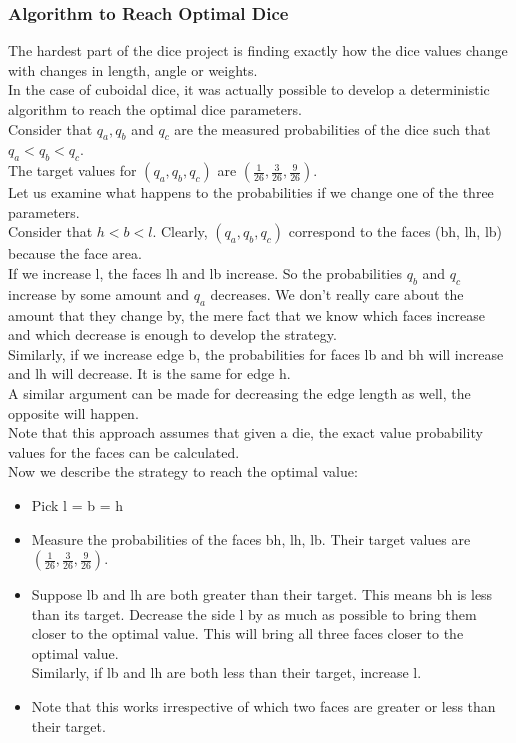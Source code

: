 \subsubsection{Algorithm to Reach Optimal Dice}
The hardest part of the dice project is finding exactly how the dice values change with changes in length, angle or weights.\\
In the case of cuboidal dice, it was actually possible to develop a deterministic algorithm to reach the optimal dice parameters.\\
Consider that $q_a, q_b$ and $q_c$ are the measured probabilities of the dice such that $q_a < q_b < q_c$.\\
The target values for $(q_a, q_b, q_c)$ are $(\frac{1}{26}, \frac{3}{26}, \frac{9}{26})$.\\
Let us examine what happens to the probabilities if we change one of the three parameters.\\
Consider that $h < b < l$. Clearly, $(q_a, q_b, q_c)$ correspond to the faces (bh, lh, lb) because the face area.\\
If we increase l, the faces lh and lb increase. So the probabilities $q_b$ and $q_c$ increase by some amount and $q_a$ decreases. We don't really care about the amount that they change by, the mere fact that we know which faces increase and which decrease is enough to develop the strategy.\\
Similarly, if we increase edge b, the probabilities for faces lb and bh will increase and lh will decrease. It is the same for edge h.\\
A similar argument can be made for decreasing the edge length as well, the opposite will happen.\\
Note that this approach assumes that given a die, the exact value probability values for the faces can be calculated.\\
Now we describe the strategy to reach the optimal value:\\
\begin{itemize}
    \item Pick l = b = h\\
    \item Measure the probabilities of the faces bh, lh, lb. Their target values are $(\frac{1}{26}, \frac{3}{26}, \frac{9}{26})$.\\
    \item Suppose lb and lh are both greater than their target. This means bh is less than its target. Decrease the side l by as much as possible to bring them closer to the optimal value. This will bring all three faces closer to the optimal value.\\
    Similarly, if lb and lh are both less than their target, increase l.\\
    \item Note that this works irrespective of which two faces are greater or less than their target.\\
    
\end{itemize}

